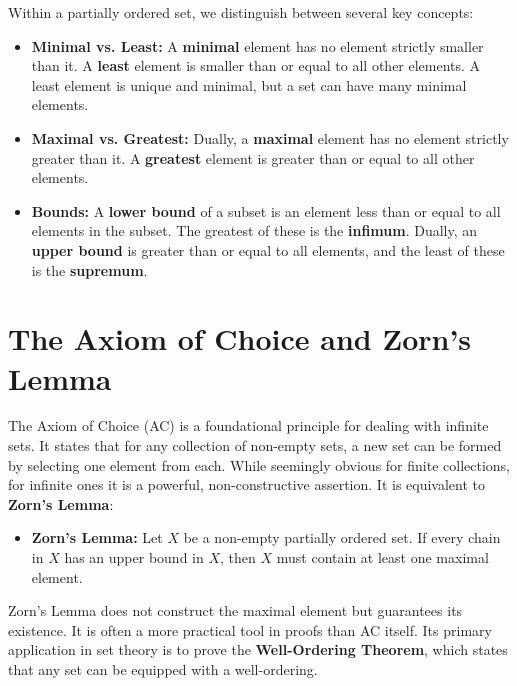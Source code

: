 \documentclass[11pt, a4paper]{article}
\begin{document}
Within a partially ordered set, we distinguish between several key concepts:
\begin{itemize}
    \item \textbf{Minimal vs. Least:} A \textbf{minimal} element has no element strictly smaller than it. A \textbf{least} element is smaller than or equal to all other elements. A least element is unique and minimal, but a set can have many minimal elements.
    \item \textbf{Maximal vs. Greatest:} Dually, a \textbf{maximal} element has no element strictly greater than it. A \textbf{greatest} element is greater than or equal to all other elements.
    \item \textbf{Bounds:} A \textbf{lower bound} of a subset is an element less than or equal to all elements in the subset. The greatest of these is the \textbf{infimum}. Dually, an \textbf{upper bound} is greater than or equal to all elements, and the least of these is the \textbf{supremum}.
\end{itemize}

\section{The Axiom of Choice and Zorn's Lemma}
The Axiom of Choice (AC) is a foundational principle for dealing with infinite sets. It states that for any collection of non-empty sets, a new set can be formed by selecting one element from each. While seemingly obvious for finite collections, for infinite ones it is a powerful, non-constructive assertion. It is equivalent to \textbf{Zorn's Lemma}:
\begin{itemize}
    \item \textbf{Zorn's Lemma:} Let $X$ be a non-empty partially ordered set. If every chain in $X$ has an upper bound in $X$, then $X$ must contain at least one maximal element.
\end{itemize}
Zorn's Lemma does not construct the maximal element but guarantees its existence. It is often a more practical tool in proofs than AC itself. Its primary application in set theory is to prove the \textbf{Well-Ordering Theorem}, which states that any set can be equipped with a well-ordering.
\end{document}
